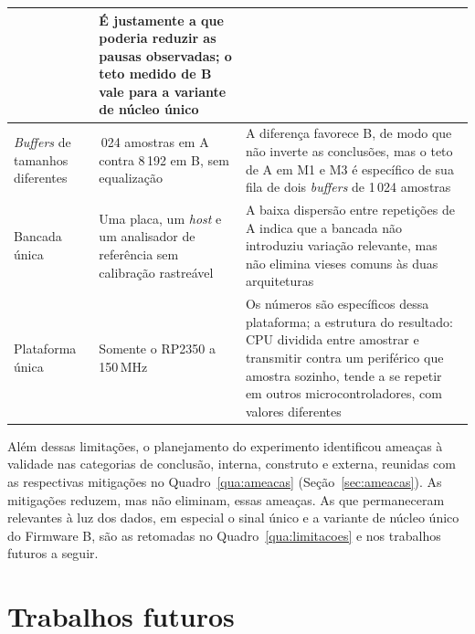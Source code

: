 \begin{quadro}[H]
\begin{tabularx}{\linewidth}{|>{\raggedright\arraybackslash}p{3.0cm}|>{\raggedright\arraybackslash}X|>{\raggedright\arraybackslash}X|}
                       & É justamente a que poderia reduzir as pausas observadas; o teto medido de B vale para a variante de núcleo único                                                                                                                                                       \\ \hline
    \emph{Buffers} de tamanhos diferentes
                       & 1\,024 amostras em A contra 8\,192 em B, sem equalização
                       & A diferença favorece B, de modo que não inverte as conclusões, mas o teto de A em M1 e M3 é específico de sua fila de dois \emph{buffers} de 1\,024 amostras                                                                                                           \\ \hline
    Bancada única
                       & Uma placa, um \emph{host} e um analisador de referência sem calibração rastreável
                       & A baixa dispersão entre repetições de A indica que a bancada não introduziu variação relevante, mas não elimina vieses comuns às duas arquiteturas                                                                                                                     \\ \hline
    Plataforma única
                       & Somente o RP2350 a 150\,MHz
                       & Os números são específicos dessa plataforma; a estrutura do resultado: \ac{CPU} dividida entre amostrar e transmitir contra um periférico que amostra sozinho, tende a se repetir em outros microcontroladores, com valores diferentes                                 \\ \hline
  \end{tabularx}
\end{quadro}

Além dessas limitações, o planejamento do experimento identificou ameaças à
validade nas categorias de conclusão, interna, construto e externa, reunidas
com as respectivas mitigações no Quadro~\ref{qua:ameacas}
(Seção~\ref{sec:ameacas}). As mitigações reduzem, mas não eliminam, essas ameaças. As que permaneceram
relevantes à luz dos dados, em especial o sinal único e a variante de núcleo
único do Firmware B, são as retomadas no Quadro~\ref{qua:limitacoes} e nos
trabalhos futuros a seguir.

\section{Trabalhos futuros}\label{sec:trabalhos-futuros}

